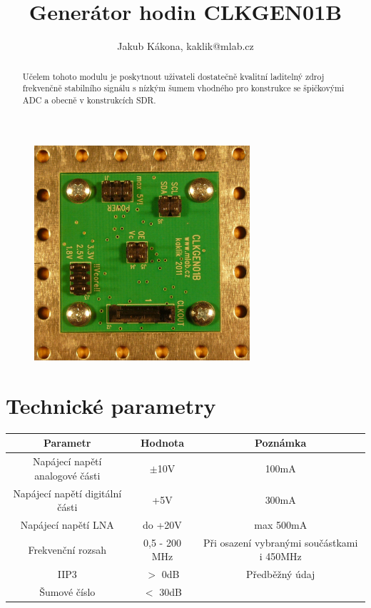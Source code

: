 \documentclass[12pt,a4paper,twoside]{article}
\begin{document}
\title{Generátor hodin CLKGEN01B}
\author{Jakub Kákona, kaklik@mlab.cz}
\maketitle

\thispagestyle{empty}
\begin{abstract}
Učelem tohoto modulu je poskytnout uživateli dostatečně kvalitní laditelný zdroj frekvenčně stabilního signálu s nízkým šumem vhodného pro konstrukce se špičkovými ADC a obecně v konstrukcích SDR.
\end{abstract}

\begin{figure} [htbp]
\begin{center}
\includegraphics [width=80mm] {CLKGEN01B_Top_Big.jpg} 
\end{center}
\end{figure}

\tableofcontents

\section{Technické parametry}
\begin{table}[htbp]
\begin{center}
\begin{tabular}{|c|c|c|}
\hline
\multicolumn{1}{|c|}{Parametr} & \multicolumn{1}{|c|}{Hodnota} & \multicolumn{1}{|c|}{Poznámka} \\ \hline
Napájecí napětí analogové části & $\pm$10V &  100mA \\ \hline
Napájecí napětí digitální části & +5V &  300mA \\ \hline
Napájecí napětí LNA & do +20V &  max 500mA \\ \hline
Frekvenční rozsah  & 0,5 - 200 MHz & Při osazení vybranými součástkami i 450MHz \\ \hline
IIP3  & $>$ 0dB & Předběžný údaj \\ \hline
Šumové číslo  & $<$ 30dB & \\ \hline
\end{tabular}
\end{center}
\end{table}
\end{document}
